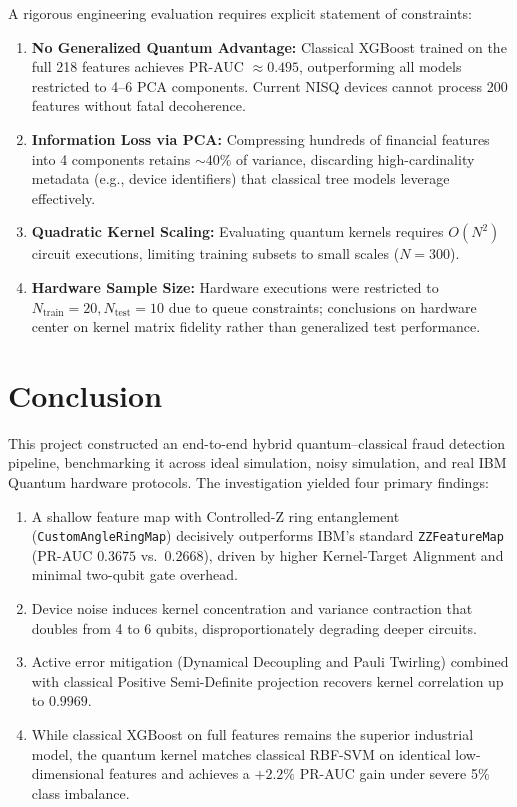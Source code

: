 \documentclass[12pt,a4paper]{article}
\begin{document}
A rigorous engineering evaluation requires explicit statement of constraints:
\begin{enumerate}
    \item \textbf{No Generalized Quantum Advantage:} Classical XGBoost trained on the full 218 features achieves PR-AUC $\approx 0.495$, outperforming all models restricted to 4--6 PCA components. Current NISQ devices cannot process 200 features without fatal decoherence.
    \item \textbf{Information Loss via PCA:} Compressing hundreds of financial features into 4 components retains $\sim 40\%$ of variance, discarding high-cardinality metadata (e.g., device identifiers) that classical tree models leverage effectively.
    \item \textbf{Quadratic Kernel Scaling:} Evaluating quantum kernels requires $O(N^2)$ circuit executions, limiting training subsets to small scales ($N=300$).
    \item \textbf{Hardware Sample Size:} Hardware executions were restricted to $N_{\text{train}}=20, N_{\text{test}}=10$ due to queue constraints; conclusions on hardware center on kernel matrix fidelity rather than generalized test performance.
\end{enumerate}

\section{Conclusion}

This project constructed an end-to-end hybrid quantum--classical fraud detection pipeline, benchmarking it across ideal simulation, noisy simulation, and real IBM Quantum hardware protocols. The investigation yielded four primary findings:
\begin{enumerate}
    \item A shallow feature map with Controlled-Z ring entanglement (\texttt{CustomAngleRingMap}) decisively outperforms IBM's standard \texttt{ZZFeatureMap} (PR-AUC $0.3675$ vs.\ $0.2668$), driven by higher Kernel-Target Alignment and minimal two-qubit gate overhead.
    \item Device noise induces kernel concentration and variance contraction that doubles from 4 to 6 qubits, disproportionately degrading deeper circuits.
    \item Active error mitigation (Dynamical Decoupling and Pauli Twirling) combined with classical Positive Semi-Definite projection recovers kernel correlation up to $0.9969$.
    \item While classical XGBoost on full features remains the superior industrial model, the quantum kernel matches classical RBF-SVM on identical low-dimensional features and achieves a $+2.2\%$ PR-AUC gain under severe 5\% class imbalance.
\end{enumerate}
\end{document}
